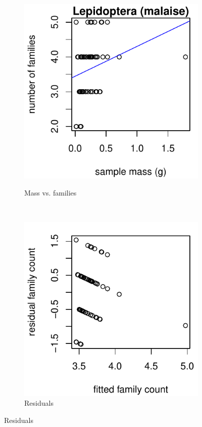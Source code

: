 \documentclass[10pt,letterpaper,twocolumn]{article}
\begin{document}
\begin{figure}[h]
	\centering
	\begin{subfigure}[b]{0.15\textwidth}
		\caption{Mass vs. families}
		\includegraphics[width=\textwidth]{plots/mass-vs-count/scatter/2015_malaise_Lepidoptera_mass-vs-count.pdf}
		\label{fig:malaise_lepidoptera_scatter}
	\end{subfigure}
	~
	\begin{subfigure}[b]{0.15\textwidth}
		\caption{Residuals}
		\includegraphics[width=\textwidth]{plots/mass-vs-count/residual/2015_malaise_Lepidoptera_residual.pdf}

\end{subfigure}
\end{figure}
\end{document}
